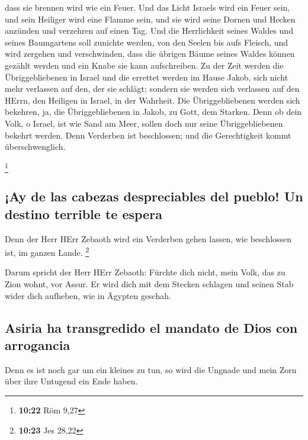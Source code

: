 dass sie brennen wird wie ein Feuer.  Und das Licht
Israels wird ein Feuer sein, und sein Heiliger wird eine Flamme sein,
und sie wird seine Dornen und Hecken anzünden und verzehren auf einen
Tag.  Und die Herrlichkeit seines Waldes und seines
Baumgartens soll zunichte werden, von den Seelen bis aufs Fleisch, und
wird zergehen und verschwinden,  dass die übrigen Bäume
seines Waldes können gezählt werden und ein Knabe sie kann aufschreiben.
 Zu der Zeit werden die Übriggebliebenen in Israel und
die errettet werden im Hause Jakob, sich nicht mehr verlassen auf den,
der sie schlägt; sondern sie werden sich verlassen auf den HErrn, den
Heiligen in Israel, in der Wahrheit.  Die
Übriggebliebenen werden sich bekehren, ja, die Übriggebliebenen in
Jakob, zu Gott, dem Starken.  Denn ob dein Volk, o
Israel, ist wie Sand am Meer, sollen doch nur seine Übriggebliebenen
bekehrt werden. Denn Verderben ist beschlossen; und die Gerechtigkeit
kommt überschwenglich.

\footnote{\textbf{10:22} Röm 9,27}

\hypertarget{ay-de-las-cabezas-despreciables-del-pueblo-un-destino-terrible-te-espera}{%
\subsection{¡Ay de las cabezas despreciables del pueblo! Un destino
terrible te
espera}\label{ay-de-las-cabezas-despreciables-del-pueblo-un-destino-terrible-te-espera}}

 Denn der Herr HErr Zebaoth wird ein Verderben gehen
lassen, wie beschlossen ist, im ganzen Lande. \footnote{\textbf{10:23}
  Jes 28,22}

 Darum spricht der Herr HErr Zebaoth: Fürchte dich nicht,
mein Volk, das zu Zion wohnt, vor Assur. Er wird dich mit dem Stecken
schlagen und seinen Stab wider dich aufheben, wie in Ägypten geschah.

\hypertarget{asiria-ha-transgredido-el-mandato-de-dios-con-arrogancia}{%
\subsection{Asiria ha transgredido el mandato de Dios con
arrogancia}\label{asiria-ha-transgredido-el-mandato-de-dios-con-arrogancia}}

 Denn es ist noch gar um ein kleines zu tun, so wird die
Ungnade und mein Zorn über ihre Untugend ein Ende haben.

